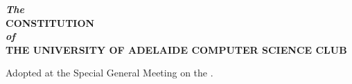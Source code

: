 \begin{titlepage}
    \begin{center}
        \vspace{1cm}
        \LARGE\textbf{\textit{The}} \\
        \huge\textbf{CONSTITUTION} \\
        \LARGE\textbf{\textit{of}} \\
        \huge\textbf{THE UNIVERSITY OF ADELAIDE COMPUTER SCIENCE CLUB}

        \vfill
        
        \vfill

        \Large
        Adopted at the Special General Meeting on the \adoptedLongDate.
    \end{center}
\end{titlepage}
